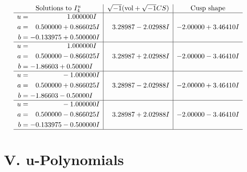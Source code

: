 \documentclass[1p]{elsarticle_modified}
\theoremstyle{definition}
\newcommand{\I}{\sqrt{-1}}
\begin{document}
$$\begin{array}{c|c|c}  
\text{Solutions to }I^u_{4}& \I (\text{vol} + \sqrt{-1}CS) & \text{Cusp shape}\\
 \hline 
\begin{aligned}
u &= \phantom{-0.000000 -}1.000000 I \\
a &= \phantom{-}0.500000 + 0.866025 I \\
b &= -0.133975 + 0.500000 I\end{aligned}
 & \phantom{-}3.28987 - 2.02988 I & -2.00000 + 3.46410 I \\ \hline\begin{aligned}
u &= \phantom{-0.000000 -}1.000000 I \\
a &= \phantom{-}0.500000 - 0.866025 I \\
b &= -1.86603 + 0.50000 I\end{aligned}
 & \phantom{-}3.28987 + 2.02988 I & -2.00000 - 3.46410 I \\ \hline\begin{aligned}
u &= \phantom{-0.000000 } -1.000000 I \\
a &= \phantom{-}0.500000 + 0.866025 I \\
b &= -1.86603 - 0.50000 I\end{aligned}
 & \phantom{-}3.28987 - 2.02988 I & -2.00000 + 3.46410 I \\ \hline\begin{aligned}
u &= \phantom{-0.000000 } -1.000000 I \\
a &= \phantom{-}0.500000 - 0.866025 I \\
b &= -0.133975 - 0.500000 I\end{aligned}
 & \phantom{-}3.28987 + 2.02988 I & -2.00000 - 3.46410 I\\
 \hline 
 \end{array}$$\newpage
\newpage\renewcommand{\arraystretch}{1}
\centering \section*{ V. u-Polynomials}
\end{document}
